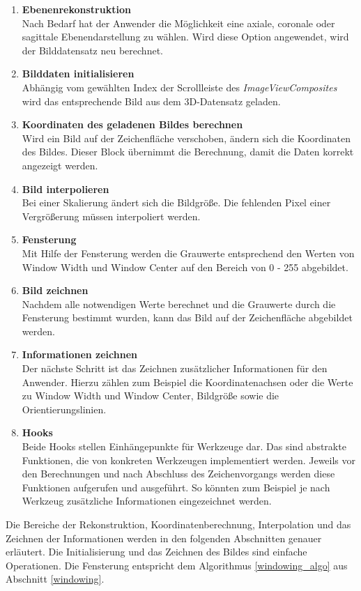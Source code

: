 \begin{enumerate}
\item \textbf{Ebenenrekonstruktion}\\
	Nach Bedarf hat der Anwender die Möglichkeit eine axiale, coronale oder sagittale Ebenendarstellung zu wählen. Wird diese Option angewendet, wird der Bilddatensatz neu berechnet.
\item \textbf{Bilddaten initialisieren}\\
	Abhängig vom gewählten Index der Scrollleiste des \textit{ImageViewComposites} wird das entsprechende Bild aus dem 3D-Datensatz geladen.
\item \textbf{Koordinaten des geladenen Bildes berechnen}\\
	Wird ein Bild auf der Zeichenfläche verschoben, ändern sich die Koordinaten des Bildes. Dieser Block übernimmt die Berechnung, damit die Daten korrekt angezeigt werden.
\item \textbf{Bild interpolieren}\\
	Bei einer Skalierung ändert sich die Bildgröße. Die fehlenden Pixel einer Vergrößerung müssen interpoliert werden.
\item \textbf{Fensterung}\\
	Mit Hilfe der Fensterung werden die Grauwerte entsprechend den Werten von Window Width und Window Center auf den Bereich von 0 - 255 abgebildet.
\item \textbf{Bild zeichnen}\\
	Nachdem alle notwendigen Werte berechnet und die Grauwerte durch die Fensterung bestimmt wurden, kann das Bild auf der Zeichenfläche abgebildet werden.
\item \textbf{Informationen zeichnen}\\
	Der nächste Schritt ist das Zeichnen zusätzlicher Informationen für den Anwender. Hierzu zählen zum Beispiel die Koordinatenachsen oder die Werte zu Window Width und Window Center, Bildgröße sowie die Orientierungslinien.
\item \textbf{Hooks}\\
	Beide Hooks stellen Einhängepunkte für Werkzeuge dar. Das sind abstrakte Funktionen, die von konkreten Werkzeugen implementiert werden. Jeweils vor den Berechnungen und nach Abschluss des Zeichenvorgangs werden diese Funktionen aufgerufen und ausgeführt. So könnten zum Beispiel je nach Werkzeug zusätzliche Informationen eingezeichnet werden.
\end{enumerate}

Die Bereiche der Rekonstruktion, Koordinatenberechnung, Interpolation und das Zeichnen der Informationen werden in den folgenden Abschnitten genauer erläutert. Die Initialisierung und das Zeichnen des Bildes sind einfache Operationen. Die Fensterung entspricht dem Algorithmus \ref{windowing_algo} aus Abschnitt \ref{windowing}.

